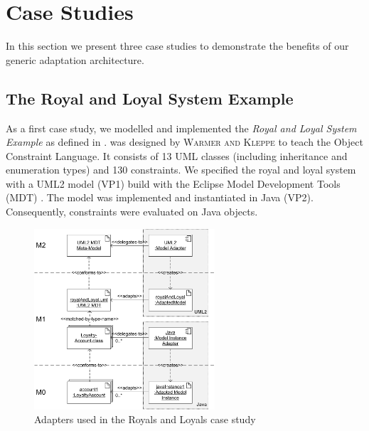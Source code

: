 \section{Case Studies}
\label{sec:caseStudies}
In this section we present three case studies to demonstrate the benefits of our
generic adaptation architecture. 


\subsection{The Royal and Loyal System Example}

As a first case study, we modelled and implemented the \textit{Royal and Loyal System Example} 
as defined in \cite{warmer:ocl}.  was designed by \textsc{Warmer
and Kleppe} to teach the Object Constraint Language. It consists of
13 UML classes (including inheritance and enumeration types) and 130 constraints. 
We specified the royal and loyal system with a UML2 model (VP1) build with the
Eclipse Model Development Tools (MDT) \cite{WWW:MDT}.
The model was implemented and instantiated in Java (VP2). 
Consequently, constraints were evaluated on Java objects.

\begin{figure}[!t]
	\centering
		\includegraphics[width=0.60\textwidth]{figures/casestudy01.pdf}
	\caption{
	Adapters used in the Royals and Loyals case study
	  }
	\label{fig:casestudy01}
\end{figure}

